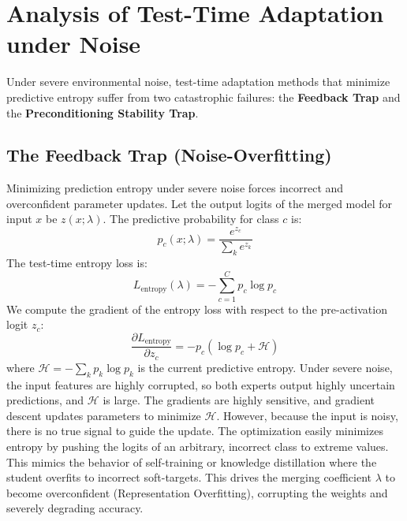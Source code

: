 \documentclass{article}
\theoremstyle{plain}
\theoremstyle{definition}
\theoremstyle{remark}
\begin{document}
\section{Analysis of Test-Time Adaptation under Noise}
\label{sec:analysis}
Under severe environmental noise, test-time adaptation methods that minimize predictive entropy suffer from two catastrophic failures: the \textbf{Feedback Trap} and the \textbf{Preconditioning Stability Trap}.

\subsection{The Feedback Trap (Noise-Overfitting)}
Minimizing prediction entropy under severe noise forces incorrect and overconfident parameter updates. Let the output logits of the merged model for input $x$ be $z(x; \lambda)$. The predictive probability for class $c$ is:
\begin{equation}
    p_c(x; \lambda) = \frac{e^{z_c}}{\sum_k e^{z_k}}
\end{equation}
The test-time entropy loss is:
\begin{equation}
    L_{\text{entropy}}(\lambda) = -\sum_{c=1}^C p_c \log p_c
\end{equation}
We compute the gradient of the entropy loss with respect to the pre-activation logit $z_c$:
\begin{equation}
    \frac{\partial L_{\text{entropy}}}{\partial z_c} = -p_c (\log p_c + \mathcal{H})
\end{equation}
where $\mathcal{H} = -\sum_k p_k \log p_k$ is the current predictive entropy. Under severe noise, the input features are highly corrupted, so both experts output highly uncertain predictions, and $\mathcal{H}$ is large. The gradients are highly sensitive, and gradient descent updates parameters to minimize $\mathcal{H}$. However, because the input is noisy, there is no true signal to guide the update. The optimization easily minimizes entropy by pushing the logits of an arbitrary, incorrect class to extreme values. This mimics the behavior of self-training or knowledge distillation \cite{hinton2015distilling} where the student overfits to incorrect soft-targets. This drives the merging coefficient $\lambda$ to become overconfident (Representation Overfitting), corrupting the weights and severely degrading accuracy.
\end{document}
